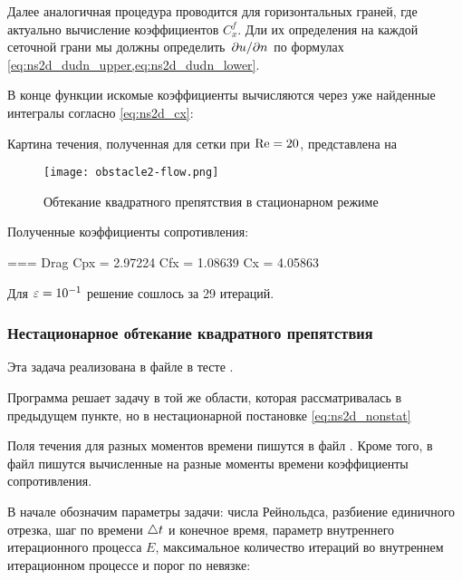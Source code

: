 Далее аналогичная процедура проводится для горизонтальных граней,
где актуально вычисление коэффициентов $C^f_x$.
Дли их определения на каждой сеточной грани мы должны определить
$\left.\partial u\middle/\partial n\right.$ по формулах \cref{eq:ns2d_dudn_upper,eq:ns2d_dudn_lower}.


В конце функции искомые коэффициенты вычисляются через
уже найденные интегралы согласно
\cref{eq:ns2d_cx}:

Картина течения, полученная для
сетки  при $\mathrm{Re} = 20$,
представлена на 
\begin{figure}[h!]
\centering
\texttt{[image: obstacle2-flow.png]}
\caption{Обтекание квадратного препятствия в стационарном режиме}
\label{fig:obstacle2-flow}
\end{figure}
Полученные коэффициенты сопротивления:
\begin{shelloutput}
=== Drag
Cpx = 2.97224
Cfx = 1.08639
Cx  = 4.05863
\end{shelloutput}
Для $\varepsilon = 10^{-1}$ решение сошлось за 29 итераций.

\subsubsection{Нестационарное обтекание квадратного препятствия}
\label{sec:prob-obstacle-temp}

Эта задача реализована в файле 
в тесте .

Программа решает задачу в той же области, которая рассматривалась
в предыдущем пункте, но в нестационарной постановке
\cref{eq:ns2d_nonstat}

Поля течения для разных моментов времени пишутся в файл
. Кроме того, в файл 
пишутся вычисленные на разные моменты времени коэффициенты сопротивления.

В начале обозначим параметры задачи:
числа Рейнольдса,
разбиение единичного отрезка,
шаг по времени $\triangle t$ и конечное время, 
параметр внутреннего итерационного процесса $E$, 
максимальное количество итераций во внутреннем итерационном процессе
и порог по невязке:

